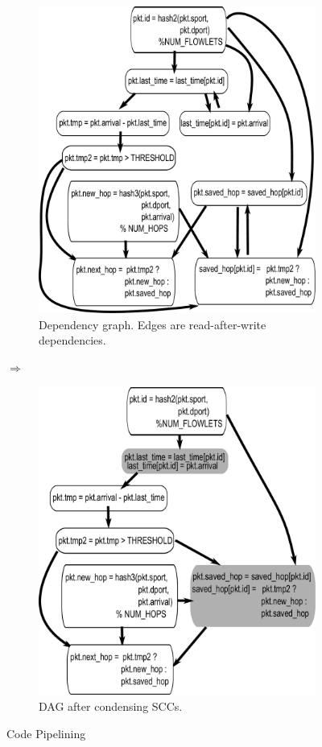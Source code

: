 \begin{figure}[!t]
\begin{subfigure}{0.5\textwidth}
  \includegraphics[width=0.8\columnwidth]{deps.pdf}
  \caption{Dependency graph. Edges are read-after-write dependencies.}
  \label{fig:partitioning_before}
\end{subfigure}
$\Longrightarrow$ 
\begin{subfigure}{0.5\textwidth}
\includegraphics[width=0.8\columnwidth]{scc.pdf}
\caption{DAG after condensing SCCs.}
\label{fig:partitioning_after}
\end{subfigure}
\caption{Code Pipelining}
\label{fig:pipelining}
\end{figure}

